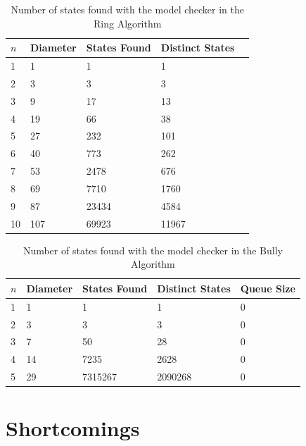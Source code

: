 \documentclass{report}
\begin{document}
\begin{table}[]
  \centering
\begin{tabular}{|l|l|l|l|l|}
\hline
$n$ & Diameter & States Found & Distinct States  \\ \hline
1   & 1        & 1            & 1                \\ \hline
2   & 3        & 3            & 3                \\ \hline
3   & 9        & 17           & 13               \\ \hline
4   & 19       & 66           & 38               \\ \hline
5   & 27       & 232          & 101              \\ \hline
6   & 40       & 773          & 262              \\ \hline
7   & 53       & 2478         & 676              \\ \hline
8   & 69       & 7710         & 1760             \\ \hline
9   & 87       & 23434        & 4584             \\ \hline
10  & 107      & 69923        & 11967            \\ \hline
\end{tabular}
  \caption{Number of states found with the model checker in the Ring Algorithm}
  \label{numstatesmodelcheckerringalgorithm}
\end{table}
\begin{table}[]
\centering
\begin{tabular}{|l|l|l|l|l|}
\hline
$n$ & Diameter & States Found & Distinct States & Queue Size \\ \hline
1   & 1        & 1            & 1               & 0          \\ \hline
2   & 3        & 3            & 3               & 0          \\ \hline
3   & 7        & 50           & 28              & 0          \\ \hline
4   & 14       & 7235         & 2628            & 0          \\ \hline
5   & 29       & 7315267      & 2090268         & 0          \\ \hline
\end{tabular}
  \caption{Number of states found with the model checker in the Bully Algorithm}
  \label{numstatesmodelcheckerbullyalgorithm}
\end{table}

\section{Shortcomings}
\end{document}

